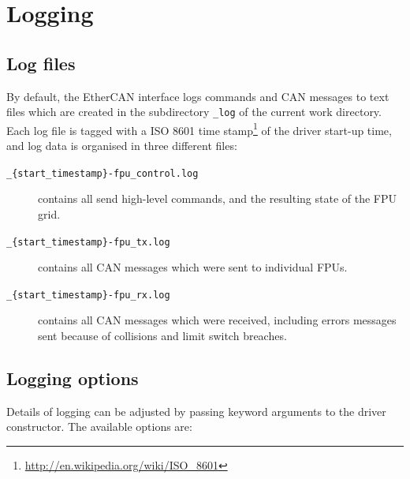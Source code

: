 \documentclass[11pt,a4paper]{report}
\begin{document}
\section{Logging}
\label{sec:logging}
\subsection{Log files}

By default, the EtherCAN interface logs commands and CAN messages to text files
which are created in the subdirectory \texttt{\_log} of the current
work directory. Each log file is tagged with a ISO 8601 time
stamp\footnote{\url{http://en.wikipedia.org/wiki/ISO\_8601}} of the
driver start-up time, and log data is organised in three different
files:

\begin{description}
\item[\texttt{\_\{start\_timestamp\}-fpu\_control.log}] contains all
  send high-level commands, and the resulting state of the FPU grid.
  
\item[\texttt{\_\{start\_timestamp\}-fpu\_tx.log}] contains all CAN messages which were sent to individual FPUs.
\item[\texttt{\_\{start\_timestamp\}-fpu\_rx.log}] contains all CAN
  messages which were received, including errors messages sent because
  of collisions and limit switch breaches.
  
\end{description}


\subsection{Logging options}
Details of logging can be adjusted by passing keyword
arguments to the driver constructor. The available options are:
\end{document}

